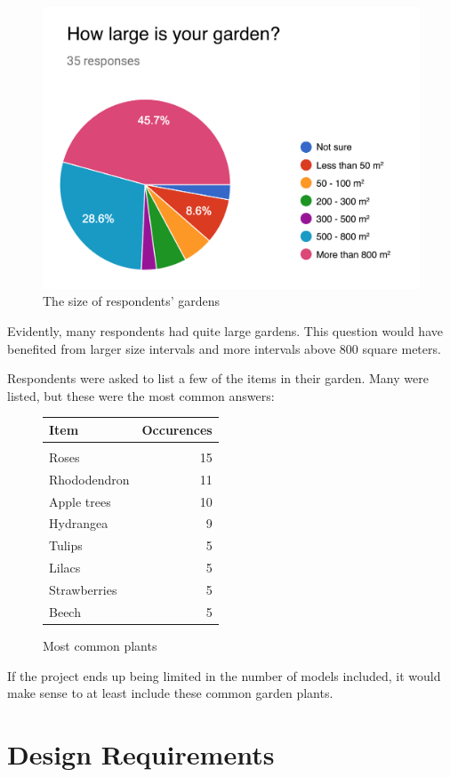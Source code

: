 			
			\begin{figure}[H]
				\centering
				\includegraphics[width=0.6\linewidth]{figure/Analysis/gardensize.png}
				\caption{The size of respondents' gardens}
				\label{fig:gardensize}
			\end{figure}
			
			Evidently, many respondents had quite large gardens. This question would have benefited from larger size intervals and more intervals above 800 square meters.
			
			Respondents were asked to list a few of the items in their garden. Many were listed, but these were the most common answers:
			\begin{figure}[H]
				\begin{center}
					\begin{tabular}{  l  r }

						Item & Occurences  \\ \hline
						& \\
						Roses & 15 \\ 
						Rhododendron & 11  \\ 
						Apple trees & 10  \\ 
						Hydrangea & 9  \\ 
						Tulips & 5  \\ 
						Lilacs & 5  \\ 
						Strawberries & 5  \\ 
						Beech & 5  \\
					\end{tabular}
				\end{center}
				\caption{Most common plants}
				\label{fig:plantlist}
			\end{figure}
			
			If the project ends up being limited in the number of models included, it would make sense to at least include these common garden plants.
			\section{Design Requirements}
			
